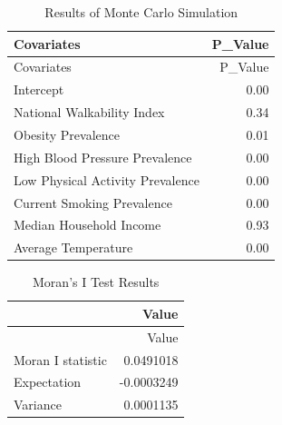\documentclass[
]{article}
\begin{document}
\begin{longtable}[]{@{}lr@{}}
\caption{Results of Monte Carlo Simulation}\tabularnewline
\toprule\noalign{}
Covariates & P\_Value \\
\midrule\noalign{}
\endfirsthead
\toprule\noalign{}
Covariates & P\_Value \\
\midrule\noalign{}
\endhead
\bottomrule\noalign{}
\endlastfoot
Intercept & 0.00 \\
National Walkability Index & 0.34 \\
Obesity Prevalence & 0.01 \\
High Blood Pressure Prevalence & 0.00 \\
Low Physical Activity Prevalence & 0.00 \\
Current Smoking Prevalence & 0.00 \\
Median Household Income & 0.93 \\
Average Temperature & 0.00 \\
\end{longtable}

\begin{longtable}[]{@{}lr@{}}
\caption{Moran's I Test Results}\tabularnewline
\toprule\noalign{}
& Value \\
\midrule\noalign{}
\endfirsthead
\toprule\noalign{}
& Value \\
\midrule\noalign{}
\endhead
\bottomrule\noalign{}
\endlastfoot
Moran I statistic & 0.0491018 \\
Expectation & -0.0003249 \\
Variance & 0.0001135 \\
\end{longtable}
\end{document}
